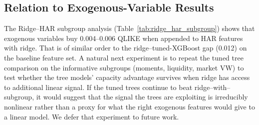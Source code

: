 \subsection{Relation to Exogenous-Variable Results}
\label{sec:discussion_exog}

The Ridge--HAR subgroup analysis (Table~\ref{tab:ridge_har_subgroup}) shows that exogenous variables buy 0.004--0.006 QLIKE when appended to HAR features with ridge. That is of similar order to the ridge--tuned-XGBoost gap (0.012) on the baseline feature set. A natural next experiment is to repeat the tuned tree comparison on the informative subgroups (moments, liquidity, market VW) to test whether the tree models' capacity advantage survives when ridge has access to additional linear signal. If the tuned trees continue to beat ridge--with--subgroup, it would suggest that the signal the trees are exploiting is irreducibly nonlinear rather than a proxy for what the right exogenous features would give to a linear model. We defer that experiment to future work.
